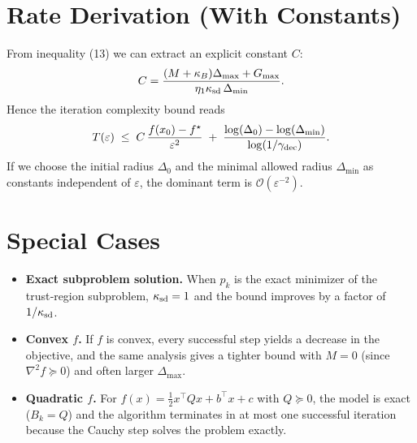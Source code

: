 \documentclass[11pt]{article}
\begin{document}
\section*{Rate Derivation (With Constants)}
From inequality (13) we can extract an explicit constant $C$:
\[
C
=
\frac{(M+\kappa_{B})\Delta_{\max}+G_{\max}}{\eta_{1}\kappa_{\rm sd}\,\Delta_{\min}}.
\]
Hence the iteration complexity bound reads
\[
T(\varepsilon)\;\le\; C\,\frac{f(x_{0})-f^{\star}}{\varepsilon^{2}} \;+\; \frac{\log(\Delta_{0})-\log(\Delta_{\min})}{\log(1/\gamma_{\rm dec})}.
\]
If we choose the initial radius $\Delta_{0}$ and the minimal allowed radius $\Delta_{\min}$ as constants independent of $\varepsilon$, the dominant term is $\mathcal{O}(\varepsilon^{-2})$.

\section*{Special Cases}
\begin{itemize}
\item \textbf{Exact subproblem solution.} When $p_{k}$ is the exact minimizer of the trust‑region subproblem, $\kappa_{\rm sd}=1$ and the bound improves by a factor of $1/\kappa_{\rm sd}$.
\item \textbf{Convex $f$.} If $f$ is convex, every successful step yields a decrease in the objective, and the same analysis gives a tighter bound with $M=0$ (since $\nabla^{2}f\succeq0$) and often larger $\Delta_{\max}$.
\item \textbf{Quadratic $f$.} For $f(x)=\tfrac12x^{\top}Qx+b^{\top}x+c$ with $Q\succeq0$, the model is exact ($B_{k}=Q$) and the algorithm terminates in at most one successful iteration because the Cauchy step solves the problem exactly.
\end{itemize}

\end{document}

